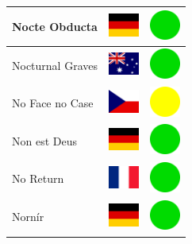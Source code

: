 \documentclass[12pt, a4paper, twoside]{report}
\begin{document}
\begin{center}
\begin{longtable}{|p{5cm}|p{2cm}|p{2cm}|}
 Nocte Obducta                                              & \includegraphics[width=1cm]{../img/flags/de} &   \includegraphics[width=1cm]{../likes/y} \\ \hline
 Nocturnal Graves                                           & \includegraphics[width=1cm]{../img/flags/au} &   \includegraphics[width=1cm]{../likes/y} \\ \hline
 No Face no Case                                            & \includegraphics[width=1cm]{../img/flags/cz} &   \includegraphics[width=1cm]{../likes/m} \\ \hline
 Non est Deus                                               & \includegraphics[width=1cm]{../img/flags/de} &   \includegraphics[width=1cm]{../likes/y} \\ \hline
 No Return                                                  & \includegraphics[width=1cm]{../img/flags/fr} &   \includegraphics[width=1cm]{../likes/y} \\ \hline
 Nornír                                                     & \includegraphics[width=1cm]{../img/flags/de} &   \includegraphics[width=1cm]{../likes/y} \\ \hline

\end{longtable}
\end{center}
\end{document}
